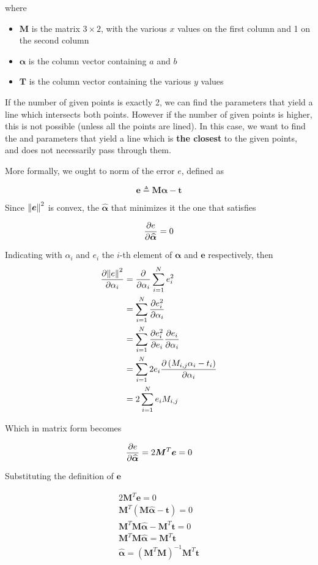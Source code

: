 \documentclass[oneside,onecolumn]{report}
\begin{document}
where
\begin{itemize}
    \item $\bm M$ is the matrix $3\times2$, with the various $x$ values on the first column and 1 on the second column
    \item $\bm \alpha$ is the column vector containing $a$ and $b$
    \item $\bm T$ is the column vector containing the various $y$ values
\end{itemize}

If the number of  given points is exactly 2, we can find the parameters that yield a line which intersects both points. However if the number of given points is higher, this is not possible (unless all the points are lined). In this case, we want to find the and parameters that yield a line which is \textbf{the closest} to the given points, and does not necessarily pass through them.

More formally, we ought to norm of the error $e$, defined as

$$ \bm e \triangleq \bm M \bm \alpha - \bm t $$

Since $\norm{\bm e}^2$ is convex, the $\bm{\widehat \alpha}$ that minimizes it the one that satisfies

$$ \pdv{e}{\bm{\widehat \alpha}} = 0 $$

Indicating with $\alpha_i$ and $e_i$ the $i$-th element of $\bm \alpha$ and $\bm e$ respectively, then
\begin{align*}
    \pdv{\norm{e}^2}{\alpha_i}
    &= \pdv{}{\alpha_i} \sum_{i = 1}^N e_i^2 \\
    &= \sum_{i = 1}^N \pdv{e_i^2}{\alpha_i} \\
    &= \sum_{i = 1}^N \pdv{e_i^2}{e_i} \pdv{e_i}{\alpha_i} \\
    &= \sum_{i = 1}^N 2 e_i \pdv{\left(M_{i,j} \alpha_i - t_i\right)}{\alpha_i}  \\
    &= 2 \sum_{i = 1}^N e_i M_{i, j}
\end{align*}

Which in matrix form becomes

$$ \pdv{e}{\bm{\widehat \alpha}} = 2 \bm M^T \bm e = 0 $$

Substituting the definition of $\bm e$

\begin{gather*}
    2 \bm M^T \bm e = 0 \\
    \bm M^T (\bm M \bm{\widehat \alpha} - \bm t) = 0 \\
    \bm M^T \bm M \bm{\widehat \alpha} - \bm M^T \bm t = 0 \\
    \bm M^T \bm M \bm{\widehat \alpha} = \bm M^T \bm t \\
    \bm{\widehat \alpha} = \left(\bm M^T \bm M \right)^{-1} \bm M^T \bm t
\end{gather*}
\end{document}
